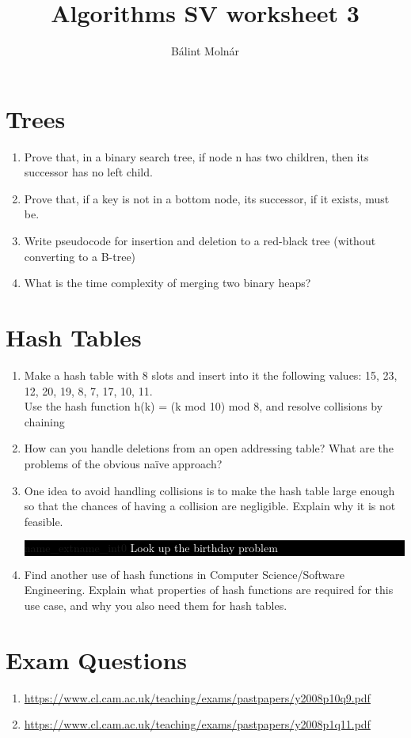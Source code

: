 \documentclass{article}
\title{{Algorithms SV worksheet 3}}
\author{Bálint Molnár}
\begin{document}
\maketitle


\section{Trees}

\begin{enumerate}
   \item Prove that, in a binary search tree, if node n has two children, then
its successor has no left child.
\item Prove that, if a key is not in a bottom node, its successor, if it exists, must be.
\item Write pseudocode for insertion and deletion to a red-black tree (without converting to a B-tree)
\item What is the time complexity of merging two binary heaps?

\end{enumerate}

\section{Hash Tables}

\begin{enumerate}
    \item Make a hash table with 8 slots and insert into it the following values:
15, 23, 12, 20, 19, 8, 7, 17, 10, 11.\\
Use the hash function 
h(k) = (k mod 10) mod 8,
and resolve collisions by chaining
\item How can you handle deletions from an open addressing table? What are the
problems of the obvious naïve approach?
\item One idea to avoid handling collisions is to make the hash table large enough so that the chances of having a collision are negligible. Explain why it is not feasible.\\
\colorbox{black}{
\begin{ocg}{name_ext}{name_int}{0}
\textcolor{white}{Look up the birthday problem}
\end{ocg}}

\item Find another use of hash functions in Computer Science/Software Engineering. Explain what properties of hash functions are required for this use case, and why you also need them for hash tables.
\end{enumerate}
\section{Exam Questions}
\begin{enumerate}
    \item \url{https://www.cl.cam.ac.uk/teaching/exams/pastpapers/y2008p10q9.pdf}
    \item \url{https://www.cl.cam.ac.uk/teaching/exams/pastpapers/y2008p1q11.pdf}
\end{enumerate}
\end{document}
